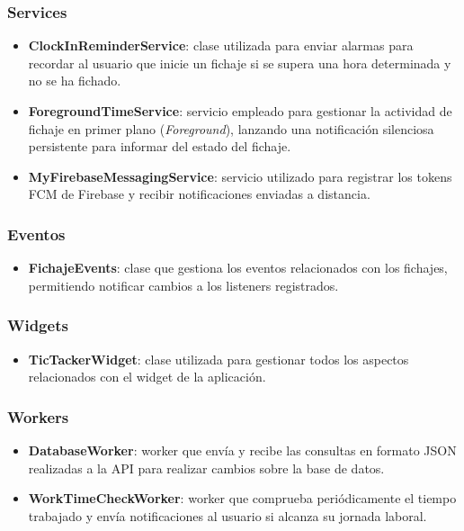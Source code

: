 \subsubsection{Services}
\begin{itemize}
  \item \textbf{ClockInReminderService}: clase utilizada para enviar alarmas para recordar al usuario que inicie un fichaje si se supera una hora determinada y no se ha fichado.
  \item \textbf{ForegroundTimeService}: servicio empleado para gestionar la actividad de fichaje en primer plano (\textit{Foreground}), lanzando una notificación silenciosa persistente para informar del estado del fichaje.
  \item \textbf{MyFirebaseMessagingService}: servicio utilizado para registrar los tokens FCM de Firebase y recibir notificaciones enviadas a distancia.
\end{itemize}

\subsubsection{Eventos}
\begin{itemize}
  \item \textbf{FichajeEvents}: clase que gestiona los eventos relacionados con los fichajes, permitiendo notificar cambios a los listeners registrados.
\end{itemize}

\subsubsection{Widgets}
\begin{itemize}
  \item \textbf{TicTackerWidget}: clase utilizada para gestionar todos los aspectos relacionados con el widget de la aplicación.
\end{itemize}

\subsubsection{Workers}
\begin{itemize}
  \item \textbf{DatabaseWorker}: worker que envía y recibe las consultas en formato JSON realizadas a la API para realizar cambios sobre la base de datos.
  \item \textbf{WorkTimeCheckWorker}: worker que comprueba periódicamente el tiempo trabajado y envía notificaciones al usuario si alcanza su jornada laboral.
\end{itemize}

